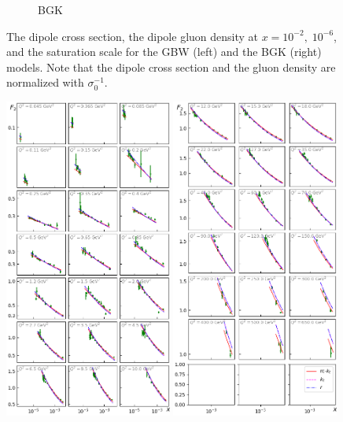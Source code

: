 \documentclass[11pt]{article}
\begin{document}
\begin{figure}[p]
\begin{multicols}{2}
\begin{subfigure}{0.5\textwidth}
    \caption{BGK}
    \label{fig:BGK}
\end{subfigure}
  \end{multicols}
  \caption{The dipole cross section, the dipole gluon density at $x=10^{-2},\;
  10^{-6}$, and the saturation scale for the GBW (left) and the BGK (right)
  models. Note that the dipole cross section and the gluon density are
  normalized with $\sigma_0^{-1}$.} 
\label{fig:GBW-BGK}
\end{figure}

\begin{figure}[p]
\includegraphics[width=0.49\textwidth]{./plots/Figure_1.png}
\includegraphics[width=0.49\textwidth]{./plots/Figure_2.png}

\end{figure}
\end{document}
